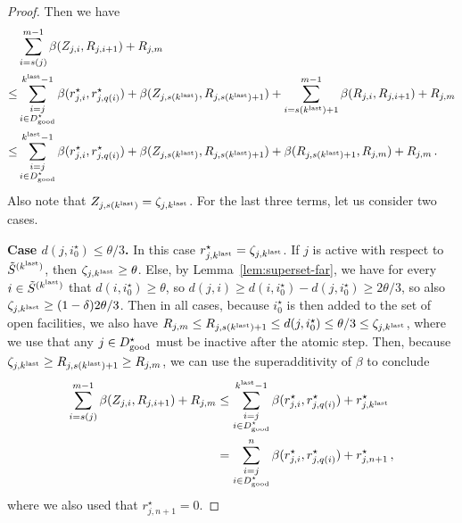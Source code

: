 \begin{proof}
Then we have
\begin{align*}
&\sum_{i=s(j)}^{m-1} \beta(Z_{j,i}, R_{j,i+1}) + R_{j, m}\\
\leq& \sum_{\substack{i=j\\i \in D^\star_{\mathrm{good}}}}^{k^{\mathrm{last}} - 1} \beta(r^\star_{j,i}, r^\star_{j,q(i)}) + \beta(Z_{j,s(k^{\mathrm{last}})}, R_{j,s(k^{\mathrm{last}})+1}) + \sum_{i=s(k^{\mathrm{last}}) + 1}^{m-1} \beta(R_{j,i}, R_{j,i+1}) + R_{j,m}\\
\leq& \sum_{\substack{i=j\\i \in D^\star_{\mathrm{good}}}}^{k^{\mathrm{last}} - 1} \beta(r^\star_{j,i}, r^\star_{j,q(i)}) + \beta(Z_{j,s(k^{\mathrm{last}})}, R_{j,s(k^{\mathrm{last}})+1}) + \beta(R_{j,s(k^{\mathrm{last}})+1}, R_{j,m}) + R_{j,m}\,.
\end{align*}
Also note that $Z_{j,s(k^{\mathrm{last}})} = \zeta_{j,k^{\mathrm{last}}}$.
For the last three terms, let us consider two cases.

\textbf{Case $d(j, i_0^\star) \leq \theta/3$.}
In this case $r^\star_{j, k^{\mathrm{last}}} = \zeta_{j, k^{\mathrm{last}}}$.
If $j$ is active with respect to $\tilde{S}^{(k^{\mathrm{last}})}$, then $\zeta_{j, k^{\mathrm{last}}} \geq \theta$.
Else, by Lemma~\ref{lem:superset-far}, we have for every $i \in \tilde{S}^{(k^{\mathrm{last}})}$ that $d(i, i_0^\star) \geq \theta$, so $d(j, i) \geq d(i, i_0^\star) - d(j, i_0^\star) \geq 2\theta/3$, so also $\zeta_{j, k^{\mathrm{last}}} \geq (1-\delta)2\theta/3$.
Then in all cases, because $i_0^\star$ is then added to the set of open facilities, we also have $R_{j,m} \leq R_{j,s(k^{\mathrm{last}})+1} \leq d(j, i_0^\star) \leq \theta/3 \leq \zeta_{j, k^{\mathrm{last}}}$, where we use that any $j \in D^\star_{\mathrm{good}}$ must be inactive after the atomic step.
Then, because $\zeta_{j, k^{\mathrm{last}}} \geq R_{j,s(k^{\mathrm{last}})+1} \geq R_{j,m}$, we can use the superadditivity of $\beta$ to conclude
\begin{align*}
\sum_{i=s(j)}^{m-1} \beta(Z_{j,i}, R_{j,i+1}) + R_{j, m}
&\leq \sum_{\substack{i=j\\i \in D^\star_{\mathrm{good}}}}^{k^{\mathrm{last}} - 1} \beta(r^\star_{j,i}, r^\star_{j,q(i)}) + r^\star_{j,k^{\mathrm{last}}}\\
&= \sum_{\substack{i=j\\i \in D^\star_{\mathrm{good}}}}^n \beta(r^\star_{j,i}, r^\star_{j,q(i)}) + r^\star_{j,n+1}\,,
\end{align*}
where we also used that $r^\star_{j,n+1}=0$.


\end{proof}
